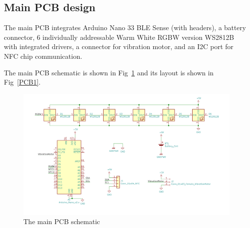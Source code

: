 \documentclass[manuscript,screen]{acmart}
\begin{document}
\subsection{Main PCB design}

The main PCB integrates Arduino Nano 33 BLE Sense (with headers), a battery connector, 6 individually addressable Warm White RGBW version WS2812B with integrated drivers, a connector for vibration motor, and an I2C port for NFC chip communication.

The main PCB schematic is shown in Fig~\ref{PCBsch1} and its layout is shown in Fig~\ref{PCB1}.

\begin{figure}[h]
  \centering
  \includegraphics[width=\linewidth]{PCBsch1.png}
  \caption{The main PCB schematic}
  \label{PCBsch1}
\end{figure}
\end{document}
